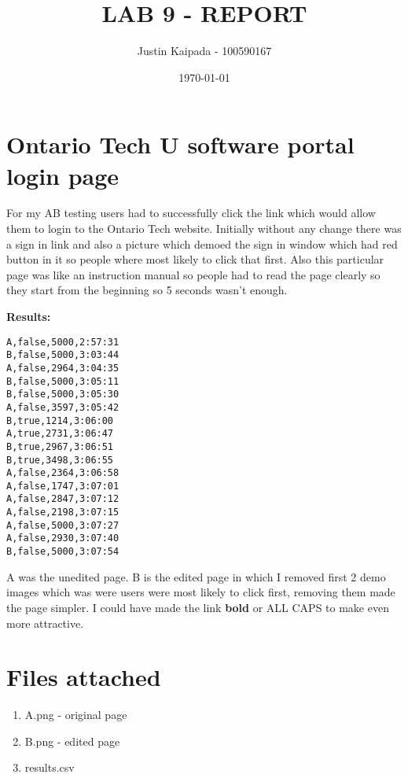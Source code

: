 \documentclass[a4paper,12pt]{article}
\author{Justin Kaipada - 100590167}
\date{\today}
\title{LAB 9 - REPORT}
\begin{document}
\maketitle
\newpage %

\section*{Ontario Tech U software portal login page}
\label{sec:org44d8a07}

For my AB testing users had to successfully click the link which would allow them to login to the
Ontario Tech website. Initially without any change there was a sign in link and also a picture which
demoed the sign in window which had red button in it so people where most likely to click that
first. Also this particular page was like an instruction manual so people had to read the page
clearly so they start from the beginning so 5 seconds wasn't enough.

\textbf{Results:}
\lstset{language=cpp,label= ,caption= ,captionpos=b,numbers=none}
\begin{lstlisting}
A,false,5000,2:57:31
B,false,5000,3:03:44
A,false,2964,3:04:35
B,false,5000,3:05:11
B,false,5000,3:05:30
A,false,3597,3:05:42
B,true,1214,3:06:00
A,true,2731,3:06:47
B,true,2967,3:06:51
B,true,3498,3:06:55
A,false,2364,3:06:58
A,false,1747,3:07:01
A,false,2847,3:07:12
A,false,2198,3:07:15
A,false,5000,3:07:27
A,false,2930,3:07:40
B,false,5000,3:07:54
\end{lstlisting}

A was the unedited page. B is the edited page in which I removed first 2 demo images which was were
users were most likely to click first, removing them made the page simpler. I could have made the
link \textbf{bold} or ALL CAPS to make even more attractive.

\section*{Files attached}
\label{sec:org46cbd92}

\begin{enumerate}
\item A.png - original page
\item B.png - edited page
\item results.csv
\end{enumerate}
\end{document}
